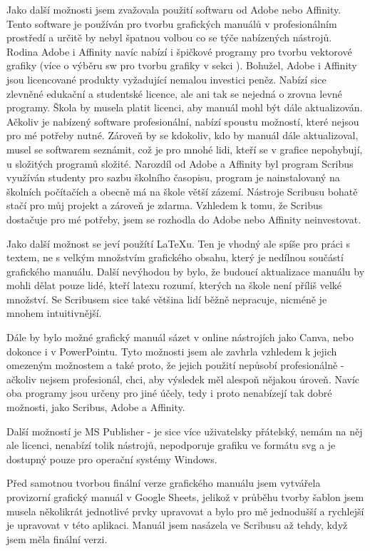 \documentclass[11pt,a4paper,twoside,openright]{report}
\begin{document}
Jako další možnosti jsem zvažovala použití softwaru od Adobe nebo Affinity. Tento software je používán pro tvorbu grafických manuálů v profesionálním prostředí a určitě by nebyl špatnou volbou co se týče nabízených nástrojů. Rodina Adobe i Affinity navíc nabízí i špičkové programy pro tvorbu vektorové grafiky (více o výběru sw pro tvorbu grafiky v sekci ). Bohužel, Adobe i Affinity jsou licencované produkty vyžadující nemalou investici peněz. Nabízí sice zlevněné edukační a studentské licence, ale ani tak se nejedná o zrovna levné programy. Škola by musela platit licenci, aby manuál mohl být dále aktualizován. Ačkoliv je nabízený software profesionální, nabízí spoustu možností, které nejsou pro mé potřeby nutné. Zároveň by se kdokoliv, kdo by manuál dále aktualizoval, musel se softwarem seznámit, což je pro mnohé lidi, kteří se v grafice nepohybují, u složitých programů složité. Narozdíl od Adobe a Affinity byl program Scribus využíván studenty pro sazbu školního časopisu, program je nainstalovaný na školních počítačích a obecně má na škole větší zázemí. Nástroje Scribusu bohatě stačí pro můj projekt a zároveň je zdarma. Vzhledem k tomu, že Scribus dostačuje pro mé potřeby, jsem se rozhodla do Adobe nebo Affinity neinvestovat.

Jako další možnost se jeví použítí LaTeXu. Ten je vhodný ale spíše pro práci s textem, ne s velkým množstvím grafického obsahu, který je nedílnou součástí grafického manuálu. Další nevýhodou by bylo, že budoucí aktualizace manuálu by mohli dělat pouze lidé, kteří latexu rozumí, kterých na škole není příliš velké množství. Se Scribusem sice také většina lidí běžně nepracuje, nicméně je mnohem intuitivnější.

Dále by bylo možné grafický manuál sázet v online nástrojích jako Canva, nebo dokonce i v PowerPointu. Tyto možnosti jsem ale zavhrla vzhledem k jejich omezeným možnostem a také proto, že jejich použití nepůsobí profesionálně - ačkoliv nejsem profesionál, chci, aby výsledek měl alespoň nějakou úroveň. Navíc oba programy jsou určeny pro jiné účely, tedy i proto nenabízejí tak dobré možnosti, jako Scribus, Adobe a Affinity.

Další možností je MS Publisher - je sice více uživatelsky přátelský, nemám na něj ale licenci, nenabízí tolik nástrojů, nepodporuje grafiku ve formátu svg a je dostupný pouze pro operační systémy Windows. 

Před samotnou tvorbou finální verze grafického manuálu jsem vytvářela provizorní grafický manuál v Google Sheets, jelikož v průběhu tvorby šablon jsem musela několikrát jednotlivé prvky upravovat a bylo pro mě jednodušší a rychlejší je upravovat v této aplikaci. Manuál jsem nasázela ve Scribusu až tehdy, když jsem měla finální verzi.
\end{document}
